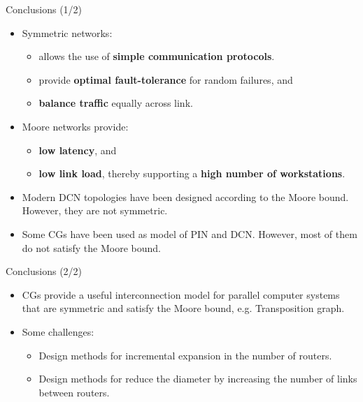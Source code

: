 \begin{frame}[t]{Conclusions (1/2)}
\begin{itemize}
    \item Symmetric networks:
    \begin{itemize}
        \item allows the use of \textbf{simple communication protocols}.
        \item provide \textbf{optimal fault-tolerance} for random failures, and
        \item \textbf{balance traffic} equally across link.
    \end{itemize}
    \item Moore networks provide:
    \begin{itemize}
        \item \textbf{low latency}, and
        \item \textbf{low link load}, thereby supporting a \textbf{high number of workstations}.
    \end{itemize}     
    \item Modern DCN topologies have been designed according to the Moore bound. However, they are not symmetric.
    \item Some CGs have been used as model of PIN and DCN. However, most of them do not satisfy the Moore bound.
\end{itemize}
\end{frame}
\begin{frame}[t]{Conclusions (2/2)}
\begin{itemize}
    \item CGs provide a useful interconnection model for parallel computer systems that are symmetric and satisfy the Moore bound, e.g. Transposition graph.
    \item Some challenges:
    \begin{itemize}
        \item Design methods for incremental expansion in the number of routers.
        \item Design methods for reduce the diameter by increasing the number of links between routers.
    \end{itemize}
\end{itemize}
\end{frame}